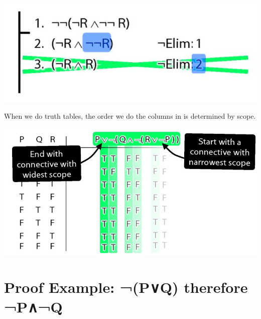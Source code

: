 \documentclass[12pt]{extarticle}
\begin{document}
\begin{multicols*}{3}
\begin{center}
\includegraphics[scale=0.3]{img/unit_290_scope_proof.png}
\end{center}
When we do truth tables, the order we do the columns in is determined by scope.
 
\begin{center}
\includegraphics[scale=0.3]{img/unit_290_scope_tt.png}
\end{center}
 
 
\section{Proof Example: ¬(P∨Q) therefore ¬P∧¬Q}
 

\end{multicols*}
\end{document}
